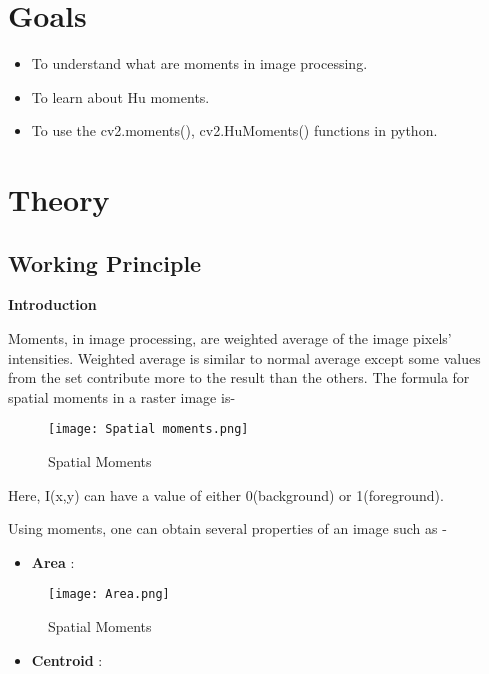 \documentclass[]{article}
\date{}
\providecommand{\tightlist}{%
  \setlength{\itemsep}{0pt}\setlength{\parskip}{0pt}}
\begin{document}
\section{Goals}\label{goals}

\begin{itemize}
\tightlist
\item
  To understand what are moments in image processing.
\item
  To learn about Hu moments.
\item
  To use the cv2.moments(), cv2.HuMoments() functions in python.
\end{itemize}

\section{Theory}\label{theory}

\subsection{Working Principle}\label{working-principle}

\textbf{Introduction}

Moments, in image processing, are weighted average of the image pixels'
intensities. Weighted average is similar to normal average except some
values from the set contribute more to the result than the others. The
formula for spatial moments in a raster image is-

\begin{figure}[htbp]
\centering
\texttt{[image: Spatial moments.png]}
\caption{Spatial Moments}
\end{figure}

Here, I(x,y) can have a value of either 0(background) or 1(foreground).

Using moments, one can obtain several properties of an image such as -

\begin{itemize}
\tightlist
\item
  \textbf{Area} :
\end{itemize}

\begin{figure}[htbp]
\centering
\texttt{[image: Area.png]}
\caption{Spatial Moments}
\end{figure}

\begin{itemize}
\tightlist
\item
  \textbf{Centroid} :
\end{itemize}
\end{document}
